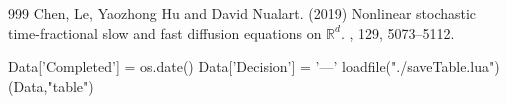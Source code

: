 \documentclass[12pt]{article} %
\newcommand {\R}{\mathbb{R}}
\begin{document}
\begin{thebibliography}{999}
Chen, Le, Yaozhong Hu and David Nualart. (2019)
\newblock Nonlinear stochastic time-fractional slow and fast diffusion
equations on $\R^d$.
, 129, 5073--5112.
\end{thebibliography}
\begin{luacode}
	Data['Completed'] = os.date()
	Data['Decision'] = '---'
	loadfile("./saveTable.lua")(Data,"table")
\end{luacode}
\end{document}
